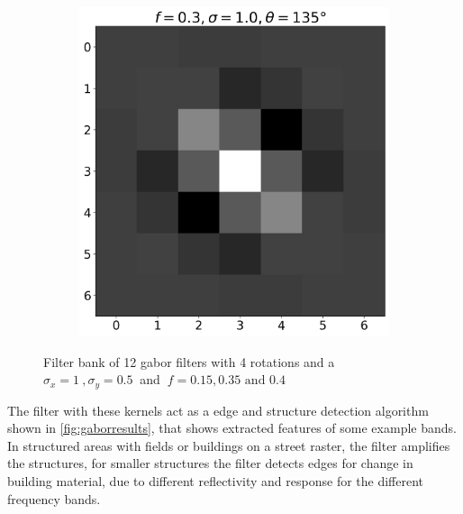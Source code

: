 \documentclass[12pt,a4paper, english,twoside]{scrartcl}
\begin{document}
\begin{figure}[!htbp]
\begin{subfigure}[b]{0.3\textwidth}
      \end{subfigure}
      \begin{subfigure}[b]{0.3\textwidth}
        \includegraphics[width=\textwidth]{img/K11.png}
      \end{subfigure}
      \caption{Filter bank of 12 gabor filters with 4 rotations and a $\sigma_x=1\ ,\sigma_y = 0.5\ $ and $\ f = 0.15, 0.35 \text{ and } 0.4$\label{fig:gaborbank}}%
    \end{figure}
%  
    \noindent
    The filter with these kernels act as a edge and structure detection algorithm shown in \cref{fig:gaborresults}, that shows extracted features of some example bands.
    In structured areas with fields or buildings on a street raster, the filter amplifies the structures, for smaller structures the filter detects edges for change in building material, due to different reflectivity and response for the different frequency bands. 
  
\end{document}
